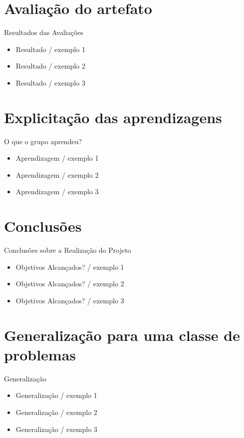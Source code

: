 \section{Avaliação do artefato}
\begin{frame}{Resultados das Avaliações}
	\begin{itemize}
		\item Resultado / exemplo 1
		\item Resultado / exemplo 2
		\item Resultado / exemplo 3
	\end{itemize}
\end{frame}

\section{Explicitação das aprendizagens}
\begin{frame}{O que o grupo aprendeu?}
	\begin{itemize}
		\item Aprendizagem / exemplo 1
		\item Aprendizagem / exemplo 2
		\item Aprendizagem / exemplo 3
	\end{itemize}
\end{frame}

\section{Conclusões}
\begin{frame}{Conclusões sobre a Realização do Projeto}
	\begin{itemize}
		\item Objetivos Alcançados? / exemplo 1
		\item Objetivos Alcançados? / exemplo 2
		\item Objetivos Alcançados? / exemplo 3
	\end{itemize}
\end{frame}

\section{Generalização para uma classe de problemas}
\begin{frame}{Generalização }
	\begin{itemize}
		\item Generalização / exemplo 1
		\item Generalização / exemplo 2
		\item Generalização / exemplo 3
	\end{itemize}
\end{frame}



